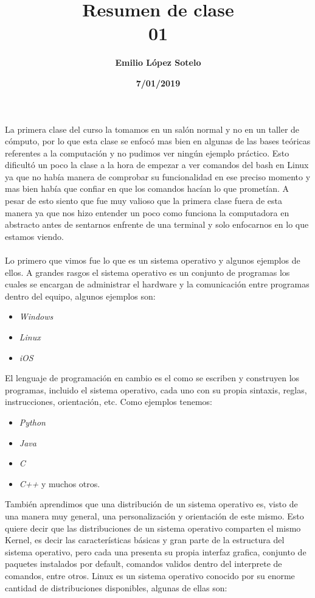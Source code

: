 \documentclass[letterpaper, 12pt, oneside]{article}
\title{\Huge \textbf{Resumen de clase\\01}}
\author{\textbf{Emilio López Sotelo}}
\date{\textbf{7/01/2019}}
\begin{document}
	\maketitle
	La primera clase del curso la tomamos en un salón normal y no en un taller de cómputo, por lo que esta clase se enfocó mas bien en algunas de las bases teóricas referentes a la computación y no pudimos ver ningún ejemplo práctico. Esto dificultó un poco la clase a la hora de empezar a ver comandos del bash en Linux ya que no había manera de comprobar su funcionalidad en ese preciso momento y mas bien había que confiar en que los comandos hacían lo que prometían. A pesar de esto siento que fue muy valioso que la primera clase fuera de esta manera ya que nos hizo entender un poco como funciona la computadora en abstracto antes de sentarnos enfrente de una terminal y solo enfocarnos en lo que estamos viendo.
	\\
	\\ 
	Lo primero que vimos fue lo que es un sistema operativo y algunos ejemplos de ellos. A grandes rasgos el sistema operativo es un conjunto de programas los cuales se encargan de administrar el hardware y la comunicación entre programas dentro del equipo, algunos ejemplos son:
	\\
	\begin{itemize}
		\item \textit{Windows}
		\item \textit{Linux}
		\item \textit{iOS}
	\\
	\end{itemize}
	El lenguaje de programación en cambio es el como se escriben y construyen los programas, incluido el sistema operativo, cada uno con su propia sintaxis, reglas, instrucciones, orientación, etc. Como ejemplos tenemos:
	\\
	\begin{itemize}
		\item \textit{Python}
		\item \textit{Java}
		\item \textit{C}
		\item \textit{C++} y muchos otros.
	\\
	\end{itemize}
	También aprendimos que una distribución de un sistema operativo es, visto de una manera muy general, una personalización y orientación de este mismo. Esto quiere decir que las distribuciones de un sistema operativo comparten el mismo Kernel, es decir las características básicas y gran parte de la estructura del sistema operativo, pero cada una presenta su propia interfaz grafica, conjunto de paquetes instalados por default, comandos validos dentro del interprete de comandos, entre otros. Linux es un sistema operativo conocido por su enorme cantidad de distribuciones disponibles, algunas de ellas son:
\end{document}

